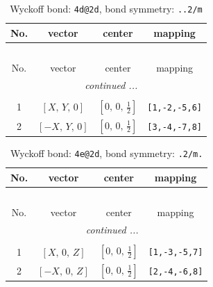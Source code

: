\documentclass[fleqn,8pt]{jsarticle}
\begin{document}
\renewcommand{\arraystretch}{1.2}
\begin{longtable}{cccc}
\caption{Wyckoff bond: {\tt 4d@2d}, bond symmetry: {\tt ..2/m}}
 \\
 \hline \hline
No. & vector & center & mapping \\ \hline \endfirsthead

\multicolumn{3}{l}{\tablename\ \thetable{}} \\
 \hline \hline
No. & vector & center & mapping \\ \hline \endhead

 \hline \hline
\multicolumn{3}{r}{\footnotesize\it continued ...} \\ \endfoot

 \hline \hline
\multicolumn{3}{r}{} \\ \endlastfoot

1 & $\left[ X,\, Y,\, 0 \right]$ & $\left[ 0,\, 0,\, \frac{1}{2} \right]$ & {\tt [1,-2,-5,6]} \\ \hline
2 & $\left[ - X,\, Y,\, 0 \right]$ & $\left[ 0,\, 0,\, \frac{1}{2} \right]$ & {\tt [3,-4,-7,8]} \\
\end{longtable}
\renewcommand{\arraystretch}{1.2}
\begin{longtable}{cccc}
\caption{Wyckoff bond: {\tt 4e@2d}, bond symmetry: {\tt .2/m.}}
 \\
 \hline \hline
No. & vector & center & mapping \\ \hline \endfirsthead

\multicolumn{3}{l}{\tablename\ \thetable{}} \\
 \hline \hline
No. & vector & center & mapping \\ \hline \endhead

 \hline \hline
\multicolumn{3}{r}{\footnotesize\it continued ...} \\ \endfoot

 \hline \hline
\multicolumn{3}{r}{} \\ \endlastfoot

1 & $\left[ X,\, 0,\, Z \right]$ & $\left[ 0,\, 0,\, \frac{1}{2} \right]$ & {\tt [1,-3,-5,7]} \\ \hline
2 & $\left[ - X,\, 0,\, Z \right]$ & $\left[ 0,\, 0,\, \frac{1}{2} \right]$ & {\tt [2,-4,-6,8]} \\
\end{longtable}
\renewcommand{\arraystretch}{1.2}
\end{document}
